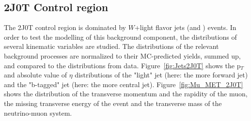 \subsection{2J0T Control region}

The 2J0T control region is dominated by $W$+light flavor jets (and \QCD) events. In order to test the modelling of this background component, the distributions of several kinematic variables are studied. The distributions of the relevant background processes are normalized to their MC-predicted yields, summed up, and compared to the distributions from data.  Figure~\ref{fig:Jets2J0T} shows the p$_{T}$ and absolute value of $\eta$ distributions of the "light" jet (here: the more forward jet) and the "b-tagged" jet (here: the more central jet). Figure~\ref{fig:Mu_MET_2J0T} shows the distribution of the transverse momentum and the rapidity of the muon, the missing transverse energy of the event and the transverse mass of the neutrino-muon system.



